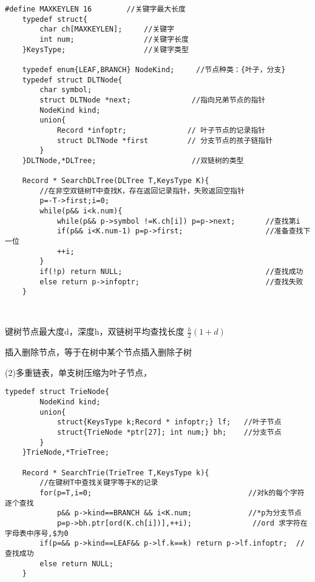 \documentclass[UTF8]{ctexart}
\begin{document}
\begin{lstlisting}[style=v1]
    #define MAXKEYLEN 16        //关键字最大长度
    typedef struct{             
        char ch[MAXKEYLEN];     //关键字
        int num;                //关键字长度
    }KeysType;                  //关键字类型

    typedef enum{LEAF,BRANCH} NodeKind;     //节点种类：{叶子，分支}
    typedef struct DLTNode{
        char symbol;
        struct DLTNode *next;              //指向兄弟节点的指针 
        NodeKind kind;
        union{
            Record *infoptr;              // 叶子节点的记录指针
            struct DLTNode *first         // 分支节点的孩子链指针 
        }
    }DLTNode,*DLTree;                      //双链树的类型 

    Record * SearchDLTree(DLTree T,KeysType K){
        //在非空双链树T中查找K，存在返回记录指针，失败返回空指针
        p=-T->first;i=0;
        while(p&& i<k.num){
            while(p&& p->symbol !=K.ch[i]) p=p->next;       //查找第i
            if(p&& i<K.num-1) p=p->first;                   //准备查找下一位
            ++i;
        }
        if(!p) return NULL;                                 //查找成功
        else return p->infoptr;                             //查找失败   
    }



\end{lstlisting}

键树节点最大度d，深度h，双链树平均查找长度 $\frac{h}{2}(1+d)$

插入删除节点，等于在树中某个节点插入删除子树

(2)多重链表，单支树压缩为叶子节点，

\newpage

\begin{lstlisting}[style=v1]
    typedef struct TrieNode{
        NodeKind kind;
        union{
            struct{KeysType k;Record * infoptr;} lf;   //叶子节点
            struct{TrieNode *ptr[27]; int num;} bh;    //分支节点
        }
    }TrieNode,*TrieTree;

    Record * SearchTrie(TrieTree T,KeysType k){
        //在键树T中查找关键字等于K的记录
        for(p=T,i=0;                                    //对k的每个字符逐个查找
            p&& p->kind==BRANCH && i<K.num;             //*p为分支节点
            p=p->bh.ptr[ord(K.ch[i])],++i);              //ord 求字符在字母表中序号,$为0   
        if(p=&& p->kind==LEAF&& p->lf.k==k) return p->lf.infoptr;  //查找成功
        else return NULL;
    }


\end{lstlisting}   
\end{document}
